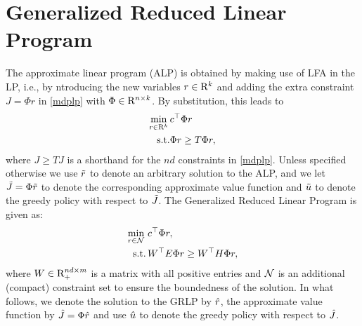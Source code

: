 \section{Generalized Reduced Linear Program}
The approximate linear program (ALP) is obtained by making use of LFA in the LP, i.e., by ntroducing the new variables $r\in \mathrm{R}^k$ and adding the extra constraint $J=\Phi r$ in \eqref{mdplp} with $\Phi \in \mathrm{R}^{n\times k}$. By substitution, this leads to
\begin{align}\label{alp}
\begin{split}
\min_{r\in \R^k}\, &c^\top \Phi r\\
\text{s.t.}\mb &\Phi r\geq T \Phi r,
\end{split}
\end{align}
where $J\geq TJ$ is a shorthand for the $nd$ constraints in \eqref{mdplp}. Unless specified otherwise we use $\tilde{r}$ to denote an arbitrary solution to the ALP, and we let $\tilde{J}=\Phi \tilde{r}$ to denote the corresponding approximate value function and $\tilde{u}$ to denote the greedy policy with respect to $\tilde{J}$.
The Generalized Reduced Linear Program is given as:
\begin{align}\label{grlp}
\begin{split}
\underset{r\in \N}{\min}\, &\, c^\top \Phi r,\\
\text{s.t.}\mb & \,W^\top E\Phi r\geq W^\top H \Phi r,
\end{split}
\end{align}
where $W \in \mathrm{R}^{nd\times m}_+$ is a matrix with all positive entries and $\mathcal{N}$ is an additional (compact) constraint set to ensure the boundedness of the solution. 
In what follows, we denote the solution to the GRLP by $\hat{r}$, the approximate value function by $\hat{J}=\Phi \hat{r}$ and use $\hat{u}$ to denote the greedy policy with respect to $\hat{J}$.

